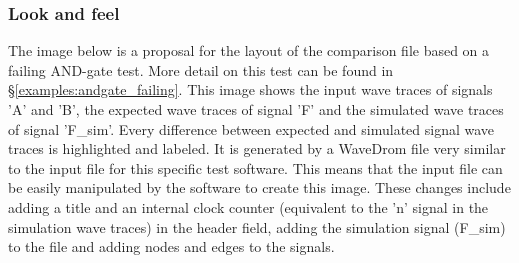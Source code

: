 \subsubsection{Look and feel}
The image below is a proposal for the layout of the comparison file based on a failing AND-gate test. More detail on this test can be found in §\ref{examples:andgate_failing}.
\nline
This image shows the input wave traces of signals 'A' and 'B', the expected wave traces of signal 'F' and the simulated wave traces of signal 'F\_sim'. Every difference between expected and simulated signal wave traces is highlighted and labeled.
\npar
It is generated by a WaveDrom file very similar to the input file for this specific test software. This means that the input file can be easily manipulated by the software to create this image.
\npar
These changes include adding a title and an internal clock counter (equivalent to the 'n' signal in the simulation wave traces) in the header field, adding the simulation signal (F\_sim) to the file and adding nodes and edges to the signals.\newpage
